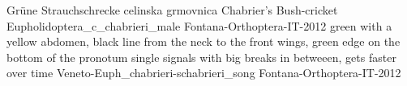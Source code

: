 {Grüne Strauchschrecke} %
{celinska grmovnica} %
{Chabrier's Bush-cricket} %
{Eupholidoptera_c_chabrieri_male} {Fontana-Orthoptera-IT-2012} %
{} {} %
{green with a yellow abdomen, black line from the neck to the front wings, green edge on the bottom of the pronotum} %
{single signals with big breaks in betweeen, gets faster over time} %
{Veneto-Euph_chabrieri-schabrieri_song} {Fontana-Orthoptera-IT-2012} %
